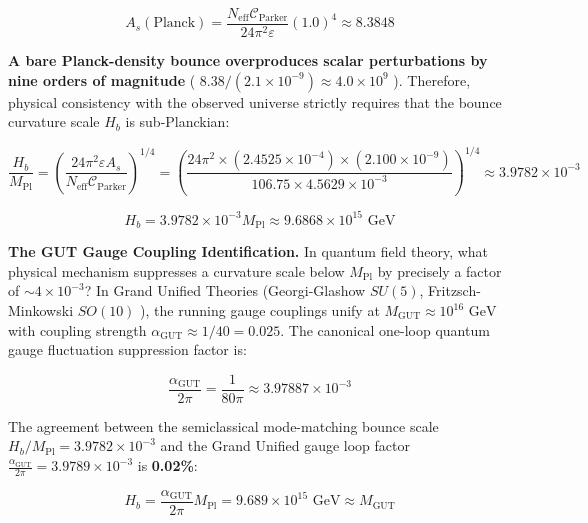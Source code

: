 \documentclass[11pt,a4paper]{article}
\theoremstyle{definition}
\theoremstyle{remark}
\begin{document}
\begin{equation}
A_s(\text{Planck}) = \frac{N_{\text{eff}} \mathcal{C}_{\text{Parker}}}{24\pi^2 \varepsilon} (1.0)^4 \approx 8.3848
\end{equation}


\textbf{A bare Planck-density bounce overproduces scalar perturbations by nine orders of magnitude} ( $8.38 / (2.1 \times 10^{-9}) \approx 4.0 \times 10^9$ ). Therefore, physical consistency with the observed universe strictly requires that the bounce curvature scale $H_b$ is sub-Planckian:


\begin{equation}
\frac{H_b}{M_{\text{Pl}}} = \left( \frac{24\pi^2 \varepsilon A_s}{N_{\text{eff}} \mathcal{C}_{\text{Parker}}} \right)^{1/4} = \left( \frac{24\pi^2 \times (2.4525 \times 10^{-4}) \times (2.100 \times 10^{-9})}{106.75 \times 4.5629 \times 10^{-3}} \right)^{1/4} \approx 3.9782 \times 10^{-3}
\end{equation}



\begin{equation}
H_b = 3.9782 \times 10^{-3} M_{\text{Pl}} \approx 9.6868 \times 10^{15} \text{ GeV}
\end{equation}


\textbf{The GUT Gauge Coupling Identification.} In quantum field theory, what physical mechanism suppresses a curvature scale below $M_{\text{Pl}}$ by precisely a factor of $\sim 4 \times 10^{-3}$? In Grand Unified Theories (Georgi-Glashow $SU(5)$, Fritzsch-Minkowski $SO(10)$ ), the running gauge couplings unify at $M_{\text{GUT}} \approx 10^{16}\text{ GeV}$ with coupling strength $\alpha_{\text{GUT}} \approx 1/40 = 0.025$. The canonical one-loop quantum gauge fluctuation suppression factor is:


\begin{equation}
\boxed{\frac{\alpha_{\text{GUT}}}{2\pi} = \frac{1}{80\pi} \approx 3.97887 \times 10^{-3}}
\end{equation}


The agreement between the semiclassical mode-matching bounce scale $H_b / M_{\text{Pl}} = 3.9782 \times 10^{-3}$ and the Grand Unified gauge loop factor $\frac{\alpha_{\text{GUT}}}{2\pi} = 3.9789 \times 10^{-3}$ is \textbf{0.02\%}:


\begin{equation}
\boxed{H_b = \frac{\alpha_{\text{GUT}}}{2\pi} M_{\text{Pl}} = 9.689 \times 10^{15}\text{ GeV} \approx M_{\text{GUT}}}
\end{equation}
\end{document}
